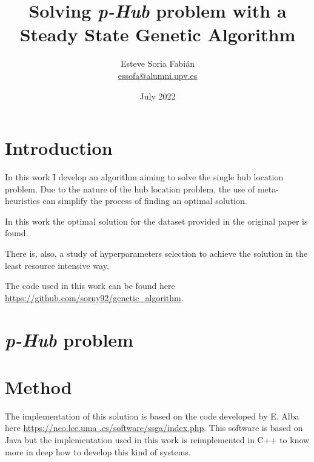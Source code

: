 \documentclass[12pt,oneside,a4paper]{article}
\title{Solving \textit{p-Hub} problem with a Steady State Genetic Algorithm}
\author{Esteve Soria Fabián \\ \href{mailto:essofa@alumni.upv.es}{essofa@alumni.upv.es}}
\date{July 2022}
\begin{document}
    \maketitle
    \newpage


    \section{Introduction}
    In this work I develop an algorithm aiming to solve the single hub location problem.
    Due to the nature of the hub location problem, the use of meta-heuristics can simplify the process of finding an
    optimal solution.

    In this work the optimal solution for the dataset provided in the original paper\cite{OKELLY1987393} is found.

    There is, also, a study of hyperparameters selection to achieve the solution in the least resource intensive way.

    The code used in this work can be found here \url{https://github.com/sorny92/genetic_algorithm}.


    \section{\textit{p-Hub} problem}



    \section{Method}
    The implementation of this solution is based on the code developed by E. Alba here \url{https://neo.lcc.uma
.es/software/ssga/index.php}.
    This software is based on Java but the implementation used in this work is reimplemented in C++ to know more in
    deep how to develop this kind of systems.
\end{document}
